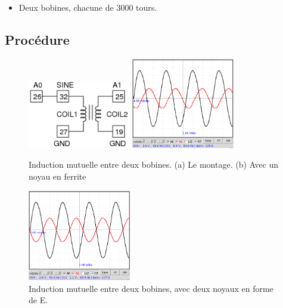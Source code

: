 \documentclass{book}
\begin{document}
\begin{itemize}
  \item Deux bobines, chacune de 3000 tours.
\end{itemize}

\subsection{Procédure}


\begin{figure}[h!]
\begin{center}
\caption{\label{fig:Mutual-Induction-between}Induction mutuelle entre deux bobines. (a) Le montage. (b) Avec un noyau en ferrite }\vspace{0.5em}
\includegraphics[width=0.4\textwidth, height=0.3\textwidth, keepaspectratio]{Schematic-transformer.png}
\includegraphics[width=0.4\textwidth, height=0.3\textwidth, keepaspectratio]{Pic-mutual-induction.png}
\end{center}
\end{figure}



\begin{figure}[h!]
\begin{center}
\caption{\label{}Induction mutuelle entre deux bobines, avec deux noyaux en forme de E. }\vspace{0.5em}
\includegraphics[width=0.4\textwidth, height=0.3\textwidth, keepaspectratio]{Pic-mutual-induction-Ecore-1kload.png}
\end{center}
\end{figure}
\end{document}
